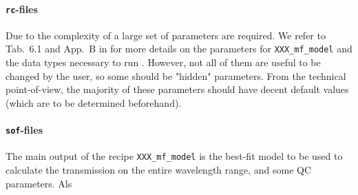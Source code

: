 \paragraph{\texttt{rc}-files\\}\label{app:mf_model_rc}
Due to the complexity of \mf a large set of parameters are required. We refer to Tab.~6.1 and App.~B in \cite{molecfit} for more details on the parameters for \texttt{XXX\_mf\_model} and the data types necessary to run \mf. However, not all of them are useful to be changed by the user, so some should be "hidden" parameters. From the technical point-of-view, the majority of these parameters should have decent default values (which are to be determined beforehand).\\
\paragraph{\texttt{sof}-files\newline}\label{app:mf_model_output}
The main output of the recipe \texttt{XXX\_mf\_model} is the best-fit model to be used to calculate the transmission on the entire wavelength range, and some \ac{QC} parameters. Als

